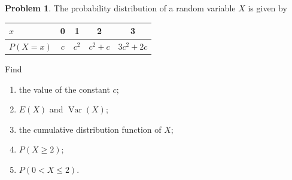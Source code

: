\documentclass[12pt,a4paper]{report}
\theoremstyle{definition}
\theoremstyle{plain}
\theoremstyle{definition}
\newtheorem{problemx}{Problem}[section]
\newenvironment{problem}{\begin{problemx}}{\end{problemx}}
\begin{document}
\begin{problem}
The probability distribution of a random variable $X$ is given by
\begin{table}[H]
\centering
\begin{tabular}{lcccc}
$x$      & 0 & 1     & 2       & 3\\
\hline
$P(X=x)$ & $c$ & $c^2$ & $c^2+c$ & $3c^2+2c$\\
\end{tabular}
\end{table}
Find
\begin{enumerate}
\item[(a).] the value of the constant $c$;
\item[(b).] $E(X)$ and $\operatorname{Var}(X)$;
\item[(c).] the cumulative distribution function of $X$;
\item[(d).] $P(X\geq 2)$;
\item[(e).] $P(0 < X \leq 2)$.
\end{enumerate}
\end{problem}
\end{document}
